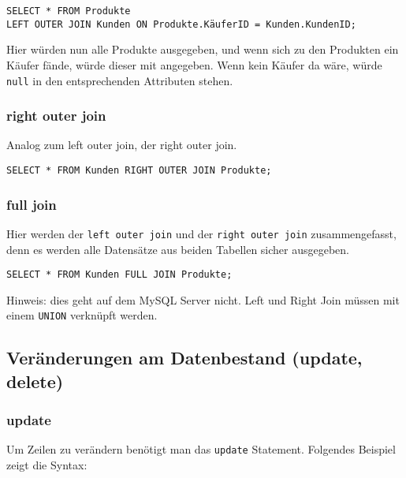 
\begin{lstlisting}[caption={Left Join SQL}]
SELECT * FROM Produkte 
LEFT OUTER JOIN Kunden ON Produkte.KäuferID = Kunden.KundenID;
\end{lstlisting}

Hier würden nun alle Produkte ausgegeben, und wenn sich zu den Produkten ein Käufer fände, würde dieser mit angegeben. Wenn kein Käufer da wäre, würde \texttt{null} in den entsprechenden Attributen stehen.

\subsubsection{right outer join}
Analog zum left outer join, der right outer join.


\begin{lstlisting}[caption={Right Join SQL}]
SELECT * FROM Kunden RIGHT OUTER JOIN Produkte;
\end{lstlisting}

\subsubsection{full join}
Hier werden der \texttt{left outer join} und der \texttt{right outer join} zusammengefasst, denn es werden alle Datensätze aus beiden Tabellen sicher ausgegeben.


\begin{lstlisting}[caption={Full Join SQL}]
SELECT * FROM Kunden FULL JOIN Produkte;
\end{lstlisting}

Hinweis: dies geht auf dem MySQL Server nicht. Left und Right Join müssen mit einem \texttt{UNION} verknüpft werden.

\subsection{Veränderungen am Datenbestand (update, delete)}

\subsubsection{update}
Um Zeilen zu verändern benötigt man das \texttt{update} Statement. Folgendes Beispiel zeigt die Syntax:

